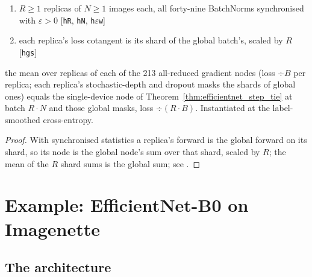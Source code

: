 \begin{theorem}
  \label{thm:efficientnet_sync_tie}
  \leanok
  \Assume{}
  \begin{enumerate}
    \item \(R \ge 1\) replicas of \(N \ge 1\) images each, all forty-nine
          BatchNorms synchronised with \(\varepsilon > 0\)
          \hfill[\texttt{hR}, \texttt{hN}, \texttt{h\(\varepsilon\)w}]
    \item each replica's loss cotangent is its shard of the global batch's,
          scaled by \(R\) \hfill[\texttt{hgs}]
  \end{enumerate}
  \Prove{} the mean over replicas of each of the 213 all-reduced gradient
  nodes (loss \(\div B\) per replica; each replica's stochastic-depth and
  dropout masks the shards of global ones) equals the single-device node of
  Theorem~\ref{thm:efficientnet_step_tie} at batch \(R \cdot N\) and those
  global masks, loss \(\div (R \cdot B)\). Instantiated at the
  label-smoothed cross-entropy.
\end{theorem}

\begin{proof}
\leanok
With synchronised statistics a replica's forward is the global forward on
its shard, so its node is the global node's sum over that shard, scaled by
\(R\); the mean of the \(R\) shard sums is the global sum; see
.
\end{proof}

\section{Example: EfficientNet-B0 on Imagenette}
\label{sec:se_efficientnet_example}

\subsection*{The architecture}

